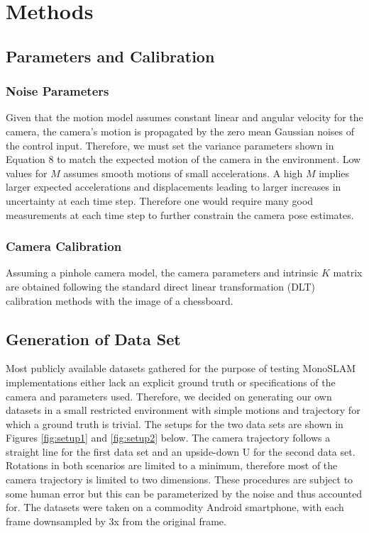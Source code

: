 \documentclass[conference]{IEEEtran}
\begin{document}
\section{Methods}

\subsection{Parameters and Calibration}

\subsubsection{Noise Parameters}
Given that the motion model assumes constant linear and angular velocity for the camera, the camera's motion is propagated by the zero mean Gaussian noises of the control input. Therefore, we must set the variance parameters shown in Equation 8 to match the expected motion of the camera in the environment. Low values for $M$ assumes smooth motions of small accelerations. A high $M$ implies larger expected accelerations and displacements leading to larger increases in uncertainty at each time step. Therefore one would require many good measurements at each time step to further constrain the camera pose estimates.

\subsubsection{Camera Calibration}
Assuming a pinhole camera model, the camera parameters and intrinsic $K$ matrix are obtained  following the standard direct linear transformation (DLT) calibration methods with the image of a chessboard.

\subsection{Generation of Data Set}
Most publicly available datasets gathered for the purpose of testing MonoSLAM implementations either lack an explicit ground truth or specifications of the camera and parameters used. Therefore, we decided on generating our own datasets in a small restricted environment with simple motions and trajectory for which a ground truth is trivial. The setups for the two data sets are shown in Figures \ref{fig:setup1} and \ref{fig:setup2} below. The camera trajectory follows a straight line for the first data set and an upside-down U for the second data set. Rotations in both scenarios are limited to a minimum, therefore most of the camera trajectory is limited to two dimensions. These procedures are subject to some human error but this can be parameterized by the noise and thus accounted for. The datasets were taken on a commodity Android smartphone, with each frame downsampled by 3x from the original frame.
\end{document}
